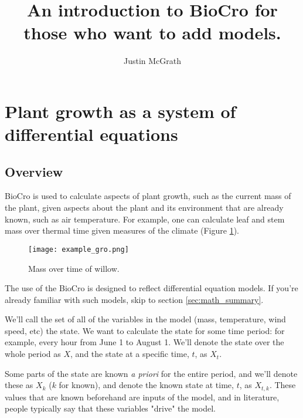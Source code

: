 \documentclass{article}
\title{An introduction to BioCro for those who want to add models.}
\author{Justin McGrath}
\begin{document}
\maketitle
\section{Plant growth as a system of differential equations}
\subsection{Overview}
BioCro is used to calculate aspects of plant growth, such as the current mass of the plant, given aspects about the plant and its environment that are already known, such as air temperature. For example, one can calculate leaf and stem mass over thermal time given measures of the climate (Figure \ref{fig:example}).
% 
% 

\begin{figure}[!h]
\centering
\texttt{[image: example\_gro.png]}
\caption{\label{fig:example}Mass over time of willow.}
\end{figure}

The use of the BioCro is designed to reflect differential equation models. If you're already familiar with such models, skip to section \ref{sec:math_summary}.
% 
% 

We'll call the set of all of the variables in the model (mass, temperature, wind speed, etc) the state. We want to calculate the state for some time period: for example, every hour from June 1 to August 1.  We'll denote the state over the whole period as $X$, and the state at a specific time, $t$, as $X_t$.
%
%

Some parts of the state are known \textit{a priori} for the entire period, and we'll denote these as $X_k$ ($k$ for known), and denote the known state at time, $t$, as $X_{t,k}$. These values that are known beforehand are inputs of the model, and in literature, people typically say that these variables "drive" the model.
\end{document}
